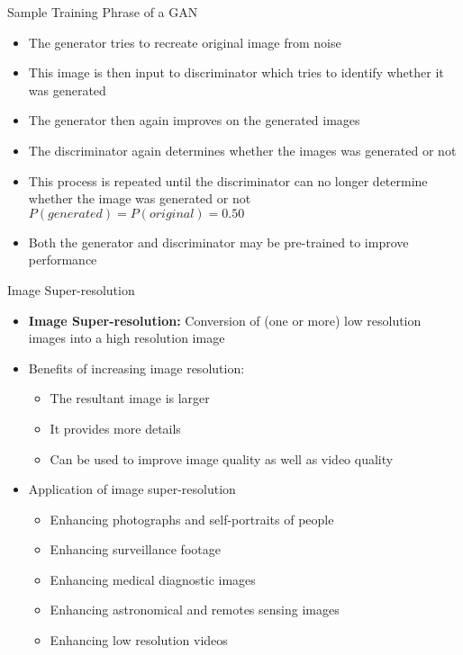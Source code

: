 \documentclass{beamer}
\begin{document}
	\begin{frame}{Sample Training Phrase of a GAN}
		\begin{itemize}
			\item The generator tries to recreate original image from noise
			\item This image is then input to discriminator which tries to identify whether it was generated
			\item The generator then again improves on the generated images
			\item The discriminator again determines whether the images was generated or not
			\item This process is repeated until the discriminator can no longer determine whether the image was generated or not $P(generated) = P(original) = 0.50$
			\item Both the generator and discriminator may be pre-trained to improve performance
		\end{itemize}
	\end{frame}

	
	\begin{frame}{Image Super-resolution}
		
		\begin{itemize}
			\item 	\textbf{Image Super-resolution:} Conversion of (one or more) low resolution images into a high resolution image 
			\item Benefits of increasing image resolution:
			\begin{itemize}
				\item The resultant image is larger
				\item It provides more details
				\item Can be used to improve image quality as well as video quality
			\end{itemize}
			\item Application of image super-resolution
			\begin{itemize}
				\item Enhancing photographs and self-portraits of people
				\item Enhancing surveillance footage
				\item Enhancing medical diagnostic images
				\item Enhancing astronomical and remotes sensing images
				\item Enhancing low resolution videos
			\end{itemize}
		\end{itemize}
	\end{frame}
	
\end{document}
